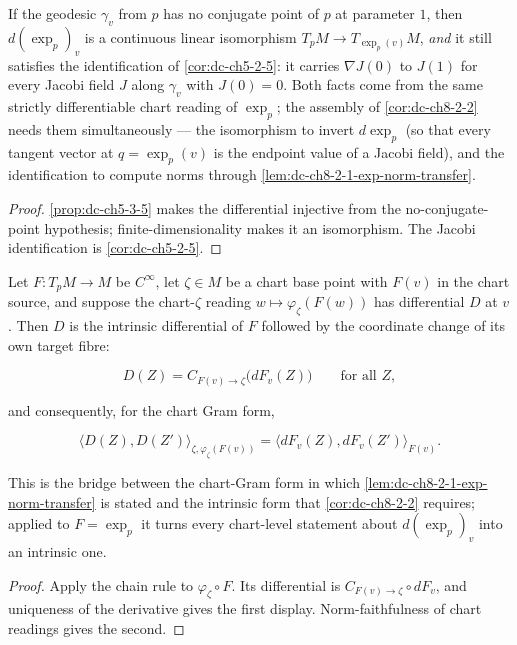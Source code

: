 \begin{lemma}
  \label{lem:dc-ch8-2-1-exp-equiv}
  \leanok
  If the geodesic $\gamma_v$ from $p$ has no conjugate point of $p$ at parameter $1$, then
  $d(\exp_p)_v$ is a continuous linear isomorphism $T_pM\to T_{\exp_p(v)}M$, \emph{and} it still
  satisfies the identification of \cref{cor:dc-ch5-2-5}: it carries $\nabla J(0)$ to $J(1)$ for
  every Jacobi field $J$ along $\gamma_v$ with $J(0)=0$. Both facts come from the same strictly
  differentiable chart reading of $\exp_p$; the assembly of \cref{cor:dc-ch8-2-2} needs them
  simultaneously --- the isomorphism to invert $d\exp_p$ (so that every tangent vector at
  $q=\exp_p(v)$ is the endpoint value of a Jacobi field), and the identification to compute
  norms through \cref{lem:dc-ch8-2-1-exp-norm-transfer}.
\end{lemma}
\begin{proof}
  \leanok
\sketch
  \cref{prop:dc-ch5-3-5} makes the differential injective from the no-conjugate-point
  hypothesis; finite-dimensionality makes it an isomorphism. The Jacobi identification is
  \cref{cor:dc-ch5-2-5}.
\end{proof}

\begin{lemma}
  \label{lem:dc-ch8-2-1-mfderiv-bridge}
  \leanok
  Let $F:T_pM\to M$ be $C^\infty$, let $\zeta\in M$ be a chart base point with $F(v)$ in the
  chart source, and suppose the chart-$\zeta$ reading $w\mapsto\varphi_\zeta(F(w))$ has
  differential $D$ at $v$. Then $D$ is the intrinsic differential of $F$ followed by the
  coordinate change of its own target fibre:

  $$
  D(Z)=C_{F(v)\to\zeta}\big(dF_v(Z)\big)\qquad\text{for all }Z ,
  $$

  and consequently, for the chart Gram form,

  $$
  \langle D(Z),D(Z')\rangle_{\zeta,\varphi_\zeta(F(v))}=\langle dF_v(Z),dF_v(Z')\rangle_{F(v)} .
  $$

  This is the bridge between the chart-Gram form in which \cref{lem:dc-ch8-2-1-exp-norm-transfer}
  is stated and the intrinsic form that \cref{cor:dc-ch8-2-2} requires; applied to $F=\exp_p$ it
  turns every chart-level statement about $d(\exp_p)_v$ into an intrinsic one.
\end{lemma}
\begin{proof}
  \leanok
\sketch
  Apply the chain rule to $\varphi_\zeta\circ F$. Its differential is
  $C_{F(v)\to\zeta}\circ dF_v$, and uniqueness of the derivative gives the first
  display. Norm-faithfulness of chart readings gives the second.
\end{proof}

